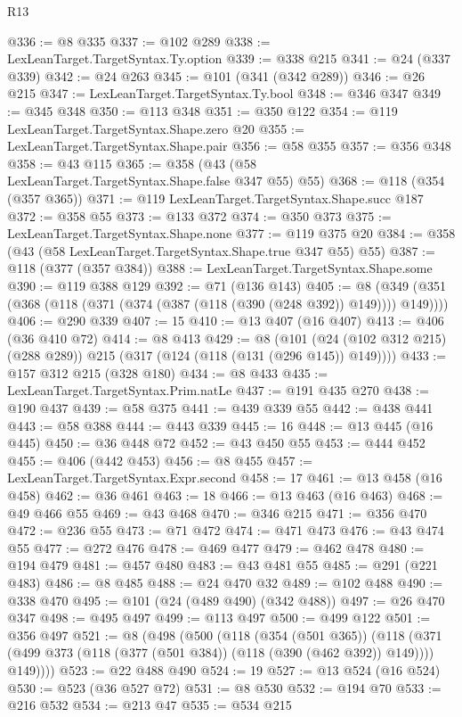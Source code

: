 \begin{lexlean}{R13}
\begin{coremodule}
@336 := @8 @335
@337 := @102 @289
@338 := LexLeanTarget.TargetSyntax.Ty.option
@339 := @338 @215
@341 := @24 (@337 @339)
@342 := @24 @263
@345 := @101 (@341 (@342 @289))
@346 := @26 @215
@347 := LexLeanTarget.TargetSyntax.Ty.bool
@348 := @346 @347
@349 := @345 @348
@350 := @113 @348
@351 := @350 @122
@354 := @119 LexLeanTarget.TargetSyntax.Shape.zero @20
@355 := LexLeanTarget.TargetSyntax.Shape.pair
@356 := @58 @355
@357 := @356 @348
@358 := @43 @115
@365 := @358 (@43 (@58 LexLeanTarget.TargetSyntax.Shape.false @347 @55) @55)
@368 := @118 (@354 (@357 @365))
@371 := @119 LexLeanTarget.TargetSyntax.Shape.succ @187
@372 := @358 @55
@373 := @133 @372
@374 := @350 @373
@375 := LexLeanTarget.TargetSyntax.Shape.none
@377 := @119 @375 @20
@384 := @358 (@43 (@58 LexLeanTarget.TargetSyntax.Shape.true @347 @55) @55)
@387 := @118 (@377 (@357 @384))
@388 := LexLeanTarget.TargetSyntax.Shape.some
@390 := @119 @388 @129
@392 := @71 (@136 @143)
@405 := @8 (@349 (@351 (@368 (@118 (@371 (@374 (@387 (@118 (@390 (@248 @392)) @149)))) @149))))
@406 := @290 @339
@407 := 15
@410 := @13 @407 (@16 @407)
@413 := @406 (@36 @410 @72)
@414 := @8 @413
@429 := @8
    (@101 (@24 (@102 @312 @215) (@288 @289)) @215 (@317 (@124 (@118 (@131 (@296 @145)) @149))))
@433 := @157 @312 @215 (@328 @180)
@434 := @8 @433
@435 := LexLeanTarget.TargetSyntax.Prim.natLe
@437 := @191 @435 @270
@438 := @190 @437
@439 := @58 @375
@441 := @439 @339 @55
@442 := @438 @441
@443 := @58 @388
@444 := @443 @339
@445 := 16
@448 := @13 @445 (@16 @445)
@450 := @36 @448 @72
@452 := @43 @450 @55
@453 := @444 @452
@455 := @406 (@442 @453)
@456 := @8 @455
@457 := LexLeanTarget.TargetSyntax.Expr.second
@458 := 17
@461 := @13 @458 (@16 @458)
@462 := @36 @461
@463 := 18
@466 := @13 @463 (@16 @463)
@468 := @49 @466 @55
@469 := @43 @468
@470 := @346 @215
@471 := @356 @470
@472 := @236 @55
@473 := @71 @472
@474 := @471 @473
@476 := @43 @474 @55
@477 := @272 @476
@478 := @469 @477
@479 := @462 @478
@480 := @194 @479
@481 := @457 @480
@483 := @43 @481 @55
@485 := @291 (@221 @483)
@486 := @8 @485
@488 := @24 @470 @32
@489 := @102 @488
@490 := @338 @470
@495 := @101 (@24 (@489 @490) (@342 @488))
@497 := @26 @470 @347
@498 := @495 @497
@499 := @113 @497
@500 := @499 @122
@501 := @356 @497
@521 := @8
    (@498
      (@500
        (@118
          (@354 (@501 @365))
          (@118 (@371 (@499 @373 (@118 (@377 (@501 @384)) (@118 (@390 (@462 @392)) @149)))) @149))))
@523 := @22 @488 @490
@524 := 19
@527 := @13 @524 (@16 @524)
@530 := @523 (@36 @527 @72)
@531 := @8 @530
@532 := @194 @70
@533 := @216 @532
@534 := @213 @47
@535 := @534 @215

\end{coremodule}
\end{lexlean}
